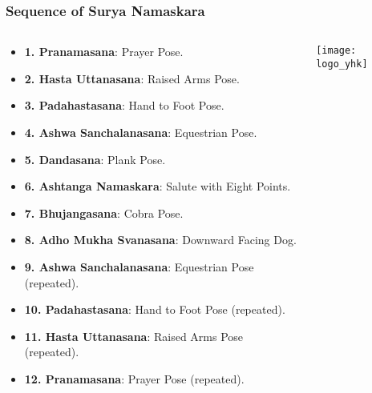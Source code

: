 \begin{frame}[fragile]\frametitle{Sequence of Surya Namaskara}
\begin{columns}
    \begin{column}[T]{0.5\linewidth}
      \begin{itemize}
        \item \textbf{1. Pranamasana}: Prayer Pose.
        \item \textbf{2. Hasta Uttanasana}: Raised Arms Pose.
        \item \textbf{3. Padahastasana}: Hand to Foot Pose.
        \item \textbf{4. Ashwa Sanchalanasana}: Equestrian Pose.
        \item \textbf{5. Dandasana}: Plank Pose.
        \item \textbf{6. Ashtanga Namaskara}: Salute with Eight Points.
        \item \textbf{7. Bhujangasana}: Cobra Pose.
        \item \textbf{8. Adho Mukha Svanasana}: Downward Facing Dog.
        \item \textbf{9. Ashwa Sanchalanasana}: Equestrian Pose (repeated).
        \item \textbf{10. Padahastasana}: Hand to Foot Pose (repeated).
        \item \textbf{11. Hasta Uttanasana}: Raised Arms Pose (repeated).
        \item \textbf{12. Pranamasana}: Prayer Pose (repeated).
      \end{itemize}
    \end{column}
    \begin{column}[T]{0.5\linewidth}
        \begin{center}
        \texttt{[image: logo\_yhk]}
        \end{center}	
    \end{column}
\end{columns}
\end{frame}

